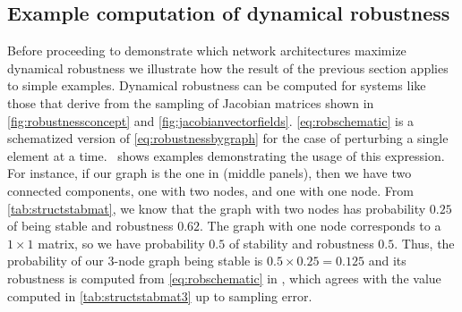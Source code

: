 \subsection{Example computation of dynamical robustness}
Before proceeding to demonstrate which network architectures maximize dynamical robustness we illustrate how the result of the previous section applies to simple examples. Dynamical robustness can be computed for systems like those that derive from the sampling of Jacobian matrices shown in \ref{fig:robustnessconcept} and \ref{fig:jacobianvectorfields}. \ref{eq:robschematic} is a schematized version of \ref{eq:robustnessbygraph} for the case of perturbing a single element at a time.  $\,$ shows examples demonstrating the usage of this expression. For instance, if our graph is the one in  (middle panels), then we have two connected components, one with two nodes, and one with one node.  From \ref{tab:structstabmat}, we know that the graph with two nodes has probability $0.25$ of being stable and robustness $0.62$.  The graph with one node corresponds to a $1 \times 1$ matrix, so we have probability $0.5$ of stability and robustness $0.5$.  Thus, the probability of our 3-node graph being stable is $0.5 \times 0.25 = 0.125$ and its robustness is computed from \ref{eq:robschematic} in , which agrees with the value computed in \ref{tab:structstabmat3} up to sampling error.

